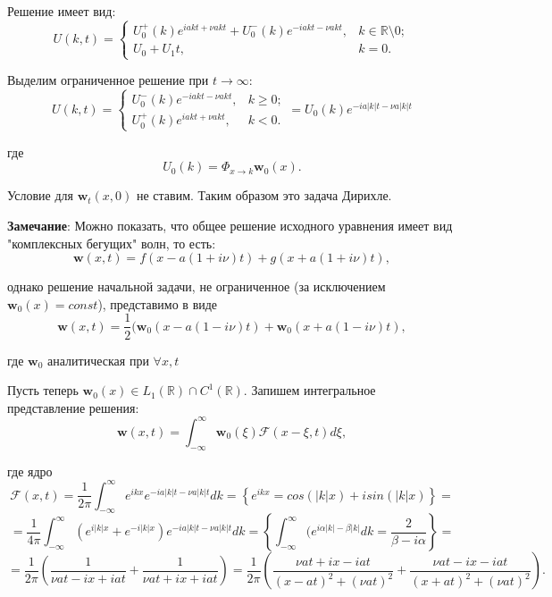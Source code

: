 \documentclass{article}
\begin{document}
Решение имеет вид:
\begin{equation*}
    U(k,t) =
	\begin{cases}
     U_0^+(k) e^{i a k t + \nu a k t} + U_0^-(k) e^{-i a k t - \nu a k t}, & k \in \mathbb{R} \setminus 0;\\
     U_0 + U_1 t,  & k =0.
     \end{cases}
\end{equation*}

Выделим ограниченное решение при $t \to \infty$:
\begin{equation*}
    U(k,t) =
	\begin{cases}
      U_0^-(k) e^{-i a k t - \nu a k t}, & k \geqslant 0;\\
      U_0^+(k) e^{i a k t + \nu a k t},  & k <0.
     \end{cases}
     = U_0(k) e^{-i a |k| t - \nu a |k| t}
\end{equation*}

где
\begin{equation*}
    U_0(k) = \Phi_{x \to k} \mathbf{w}_0(x).
\end{equation*}

Условие для $\mathbf{w}_t(x,0)$ не ставим. Таким образом это задача Дирихле.

\textbf{Замечание}: Можно показать, что общее решение исходного уравнения имеет вид "комплексных бегущих" волн, то есть:
\begin{equation*}
\mathbf{w}(x,t) = f(x-a(1+i\nu)t) + g(x + a(1+i\nu)t),
\end{equation*}

однако решение начальной задачи, не ограниченное (за исключением $\mathbf{w}_0(x) = const$), представимо в виде
\begin{equation*}
\mathbf{w}(x,t) = \dfrac{1}{2}(\mathbf{w}_0 (x-a(1-i\nu)t) + \mathbf{w}_0(x + a(1-i\nu)t),
\end{equation*}

где $\mathbf{w}_0$ аналитическая при $\forall x,t$ 


Пусть теперь $\mathbf{w}_0(x) \in L_1(\mathbb{R}) \cap C^1(\mathbb{R})$. Запишем интегральное представление решения:
\begin{equation*}
    \mathbf{w}(x,t) = \int_{-\infty}^{\infty} \mathbf{w}_0(\xi) \mathcal{F}(x-\xi,t) d\xi,
\end{equation*}

где ядро
$$
\mathcal{F}(x,t) = \frac{1}{2\pi} \int_{-\infty}^{\infty} e^{i k x} e^{-i a |k|t - \nu a |k|t} d k 
= \left\{ e^{ikx} = cos(|k|x)+ i sin(|k|x) \right\} = 
$$$$
= \dfrac{1}{4 \pi} \int_{-\infty}^{\infty} (e^{i|k|x} + e^{-i|k|x}) e^{-ia|k|t - \nu a |k|t} dk  
= \left\{ \int_{-\infty}^{\infty} (e^{i \alpha |k| - \beta |k|} dk =
\dfrac{2}{\beta - i \alpha} \right\} =
$$$$
= \frac{1}{2\pi} \left( \frac{1}{\nu a t - i x + i a t} + \frac{1}{\nu a t + i x + i a t} \right) 
= \frac{1}{2\pi} \left( \frac{\nu a t + i x - i a t}{(x - a t)^2 + (\nu a t)^2} + 
\frac{\nu a t - i x - i a t}{(x + a t)^2 + (\nu a t)^2} \right).
$$ %
\end{document}

